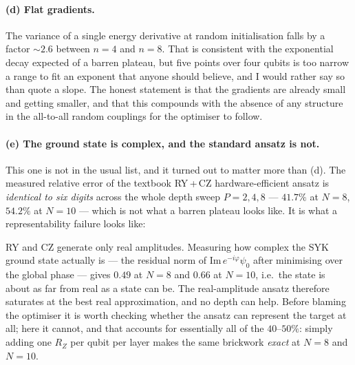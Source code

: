 \documentclass[10pt,a4paper]{article}
\begin{document}
\paragraph{(d) Flat gradients.}

\begin{center}\small

\end{center}

The variance of a single energy derivative at random initialisation falls by a
factor $\sim\!2.6$ between $n=4$ and $n=8$. That is consistent with the
exponential decay expected of a barren plateau, but five points over four
qubits is too narrow a range to fit an exponent that anyone should believe, and
I would rather say so than quote a slope. The honest statement is that the
gradients are already small and getting smaller, and that this compounds with
the absence of any structure in the all-to-all random couplings for the
optimiser to follow.

\paragraph{(e) The ground state is complex, and the standard ansatz is not.}

This one is not in the usual list, and it turned out to matter more than (d).
The measured relative error of the textbook RY\,+\,CZ hardware-efficient
ansatz is \emph{identical to six digits} across the whole depth sweep $P=2,4,8$ --- $41.7\%$ at
$N=8$, $54.2\%$ at $N=10$ --- which is not what a barren plateau looks like.
It is what a representability failure looks like:

\begin{center}\small

\end{center}

RY and CZ generate only real amplitudes. Measuring how complex the SYK ground
state actually is --- the residual norm of $\mathrm{Im}\,e^{-i\varphi}\psi_0$
after minimising over the global phase --- gives $0.49$ at $N=8$ and $0.66$ at
$N=10$, i.e.\ the state is about as far from real as a state can be. The
real-amplitude ansatz therefore saturates at the best real approximation, and
no depth can help. Before blaming the optimiser it is worth checking whether
the ansatz can represent the target at all; here it cannot, and that accounts
for essentially all of the $40$--$50\%$: simply adding one $R_Z$ per qubit per
layer makes the same brickwork \emph{exact} at $N=8$ and $N=10$.
\end{document}
